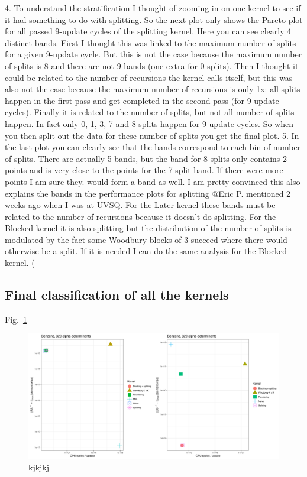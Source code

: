 \documentclass[11pt]{article}
\numberwithin{figure}{section}
\numberwithin{table}{section}
\begin{document}
4. To understand the stratification I thought of zooming in on one kernel to see if it had something to do with splitting. So the next plot only shows the Pareto plot for all passed  9-update cycles of the splitting kernel. Here you can see clearly 4 distinct bands. First I thought this was linked to the maximum number of splits for a given 9-update cycle. But this is not the case because the maximum number of splits is 8 and there are not 9 bands (one extra for 0 splits). Then I thought it could be related to the number of recursions the kernel calls itself, but this was also not the case because the maximum number of recursions is only 1x: all splits happen in the first pass and get completed in the second pass (for 9-update cycles). Finally it is related to the number of splits, but not all number of splits happen. In fact only 0, 1, 3, 7 and 8 splits happen for 9-update cycles. So when you then split out the data for these number of splits you get the final plot.
5. In the last plot you can clearly see that the bands correspond to each bin of number of splits. There are actually 5 bands, but the band for 8-splits only contains 2 points and is very close to the points for the 7-split band. If there were more points I am sure they. would form a band as well. I am pretty convinced this also explains the bands in the performance plots for splitting 
@Eric P.
 mentioned 2 weeks ago when I was at UVSQ.
For the Later-kernel these bands must be related to the number of recursions because it doesn’t do splitting. For the Blocked kernel it is also splitting but the distribution of the number of splits is modulated by the fact some Woodbury blocks of 3 succeed where there would otherwise be a split. If it is needed I can do the same analysis for the Blocked kernel. (
			
		\subsection{Final classification of all the kernels}
		
			Fig.~\ref{fig:Pareto_passfail_mean}
		
			\begin{figure}[h]
				\centering
				\includegraphics[width=1\textwidth]{Pareto_passfail_mean.png}
				\caption{kjkjkj}
				\label{fig:Pareto_passfail_mean}
			\end{figure}
\end{document}
